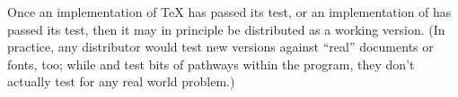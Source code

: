 Once an implementation of \TeX{} has passed its  test, or
an implementation of \MF{} has passed its  test, then it
may in principle be distributed as a working version.  (In practice,
any distributor would test new versions against ``real'' documents or
fonts, too; while  and  test bits of
pathways within the program, they don't actually test for any real
world problem.)



  



